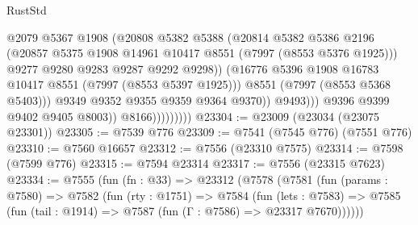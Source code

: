 \begin{lexlean}{RustStd}
\begin{coremodule}
{\begin{coremodule}
{{{{{{{{{{{{{{{{{{{{{{{{{{{{{{{{{{{{{{{{{{{                                      @2079
                                      @5367
                                      @1908
                                      (@20808
                                        @5382
                                        @5388
                                        (@20814
                                          @5382
                                          @5386
                                          @2196
                                          (@20857
                                            @5375
                                            @1908
                                            @14961
                                            @10417
                                            @8551
                                            (@7997 (@8553 @5376 @1925)))
                                          @9277
                                          @9280
                                          @9283
                                          @9287
                                          @9292
                                          @9298))
                                      (@16776
                                        @5396
                                        @1908
                                        @16783
                                        @10417
                                        @8551
                                        (@7997 (@8553 @5397 @1925)))
                                      @8551
                                      (@7997 (@8553 @5368 @5403)))
                                    @9349
                                    @9352
                                    @9355
                                    @9359
                                    @9364
                                    @9370))
                                @9493)))
                          @9396
                          @9399
                          @9402
                          @9405
                          @8003))
                      @8166)))))))))
@23304 := @23009 (@23034 (@23075 @23301))
@23305 := @7539 @776
@23309 := @7541 (@7545 @776) (@7551 @776)
@23310 := @7560 @16657
@23312 := @7556 (@23310 @7575)
@23314 := @7598 (@7599 @776)
@23315 := @7594 @23314
@23317 := @7556 (@23315 @7623)
@23334 := @7555
    (fun (fn : @33) =>
    @23312
      (@7578
        (@7581
          (fun (params : @7580) =>
          @7582
            (fun (rty : @1751) =>
            @7584
              (fun (lets : @7583) =>
              @7585 (fun (tail : @1914) => @7587 (fun (Γ : @7586) => @23317 @7670))))))
}}}}}}}}}}}}}}}}}}}}}}}}}}}}}}}}}}}}}}}}}}}
\end{coremodule}}
\end{coremodule}
\end{lexlean}
